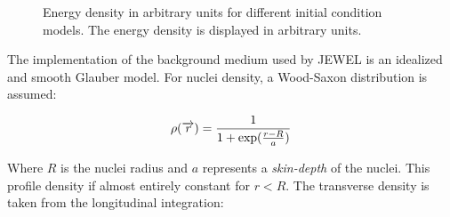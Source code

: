 \begin{figure}
\label{glauber}
\caption{Energy density in arbitrary units for different initial condition models. The energy density is displayed in arbitrary units.}
\label{ic}
\end{figure}

 \label{glauber}

The implementation of the background medium used by JEWEL is an idealized and smooth Glauber model. For nuclei density, a Wood-Saxon distribution is assumed:

\begin{equation}
\rho({\overrightarrow{\bf \it r}}) = \frac{1}{1+\exp(\frac{r-R}{a})}
\end{equation}

Where $R$ is the nuclei radius and $a$ represents a \emph{skin-depth} of the nuclei. This profile density if almost entirely constant for $r<R$. The transverse density is taken from the longitudinal integration:

